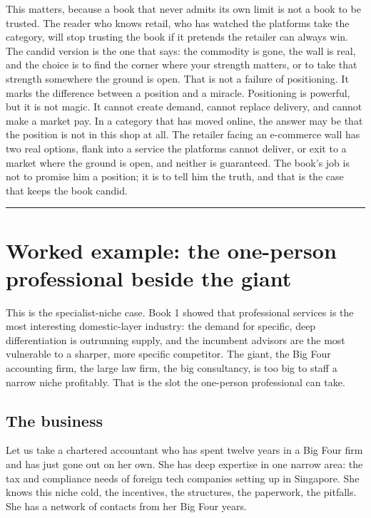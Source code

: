 \documentclass[10pt,twoside,openany]{memoir}
\newcommand{\needspacehead}{\needspace{4\baselineskip}}
\let\oldsection\section
\renewcommand{\section}{\needspacehead\oldsection}
\begin{document}
{This matters, because a book that never admits its own limit is not a
book to be trusted. The reader who knows retail, who has watched the
platforms take the category, will stop trusting the book if it pretends
the retailer can always win. The candid version is the one that says:
the commodity is gone, the wall is real, and the choice is to find the
corner where your strength matters, or to take that strength somewhere
the ground is open. That is not a failure of positioning. It marks the
difference between a position and a miracle. Positioning is powerful,
but it is not magic. It cannot create demand, cannot replace delivery,
and cannot make a market pay. In a category that has moved online, the
answer may be that the position is not in this shop at all. The retailer
facing an e-commerce wall has two real options, flank into a service the
platforms cannot deliver, or exit to a market where the ground is open,
and neither is guaranteed. The book's job is not to promise him a
position; it is to tell him the truth, and that is the case that keeps
the book candid.

\begin{center}\rule{0.5\linewidth}{0.5pt}\end{center}

\FloatBarrier
\chapter{Worked example: the one-person professional beside the
giant}\label{worked-example-the-one-person-professional-beside-the-giant}

This is the specialist-niche case. Book 1 showed that professional
services is the most interesting domestic-layer industry: the demand for
specific, deep differentiation is outrunning supply, and the incumbent
advisors are the most vulnerable to a sharper, more specific competitor.
The giant, the Big Four accounting firm, the large law firm, the big
consultancy, is too big to staff a narrow niche profitably. That is the
slot the one-person professional can take.

\section{The business}\label{the-business-4}

Let us take a chartered accountant who has spent twelve years in a Big
Four firm and has just gone out on her own. She has deep expertise in
one narrow area: the tax and compliance needs of foreign tech companies
setting up in Singapore. She knows this niche cold, the incentives, the
structures, the paperwork, the pitfalls. She has a network of contacts
from her Big Four years.

}
\end{document}
